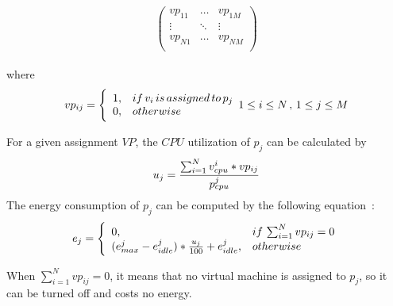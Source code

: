 \documentclass[10pt, conference, compsocconf]{IEEEtran}
\begin{document}
\begin{equation}\label{1}
    \left(
  \begin{array}{ccc}
    vp_{11} & \ldots & vp_{1M} \\
    \vdots & \ddots & \vdots \\
    vp_{N1} & \ldots & vp_{NM} \\
  \end{array}
\right)
\end{equation}\\
where\\
\begin{equation}\label{2}
    vp_{ij}=\Bigg\lbrace \begin{array}{cl}
     1, & if\, v_i\, is\, assigned\,to\, p_j \\
    0, & otherwise \\
    \end{array} \\
    1\leq i\leq N \, , \, 1\leq j\leq M
\end{equation}

 For a given assignment $VP$, the $CPU$ utilization of $p_j$ can be calculated by\\
 \begin{equation}\label{3}
 u_j=\frac{
\sum_{i=1}^Nv_{cpu}^i*vp_{ij}
 }{p_{cpu}^j} \\
\end{equation}
 The energy consumption of $p_j$ can be computed by the following
 equation~\cite{beloglazov10}:
\begin{equation}\label{4}
    e_j=\Bigg\lbrace \begin{array}{ll}
     0,& if \, \sum_{i=1}^Nvp_{ij}=0  \\
(e_{max}^j-e_{idle}^j)*\frac{u_j}{100}+e_{idle}^j,& otherwise\\
    \end{array} \\
\end{equation}

 When $\sum_{i=1}^Nvp_{ij} =0$, it means that no virtual machine is assigned to
 $p_j$, so it can be turned off and costs no energy.
\end{document}
